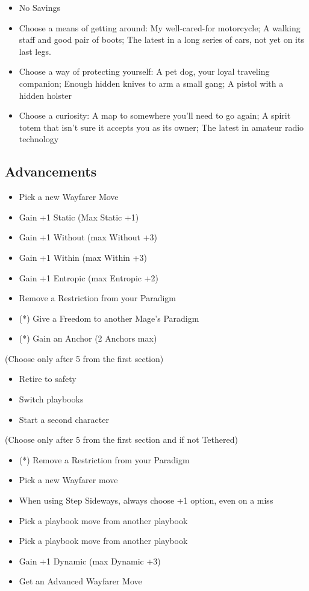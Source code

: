 \documentclass[
  oneside,
  statementpaper,
  9pt]{memoir}
\begin{document}
\begin{itemize}
\tightlist
\item
  No Savings
\item
  Choose a means of getting around: My well-cared-for motorcycle; A
  walking staff and good pair of boots; The latest in a long series of
  cars, not yet on its last legs.
\item
  Choose a way of protecting yourself: A pet dog, your loyal traveling
  companion; Enough hidden knives to arm a small gang; A pistol with a
  hidden holster
\item
  Choose a curiosity: A map to somewhere you'll need to go again; A
  spirit totem that isn't sure it accepts you as its owner; The latest
  in amateur radio technology
\end{itemize}

\hypertarget{advancements-8}{%
\subsection{Advancements}\label{advancements-8}}

\begin{itemize}
\tightlist
\item
  Pick a new Wayfarer Move
\item
  Gain +1 Static (Max Static +1)
\item
  Gain +1 Without (max Without +3)
\item
  Gain +1 Within (max Within +3)
\item
  Gain +1 Entropic (max Entropic +2)
\item
  Remove a Restriction from your Paradigm
\item
  (*) Give a Freedom to another Mage's Paradigm
\item
  (*) Gain an Anchor (2 Anchors max)
\end{itemize}

(Choose only after 5 from the first section)

\begin{itemize}
\tightlist
\item
  Retire to safety
\item
  Switch playbooks
\item
  Start a second character
\end{itemize}

(Choose only after 5 from the first section and if not Tethered)

\begin{itemize}
\tightlist
\item
  (*) Remove a Restriction from your Paradigm
\item
  Pick a new Wayfarer move
\item
  When using Step Sideways, always choose +1 option, even on a miss
\item
  Pick a playbook move from another playbook
\item
  Pick a playbook move from another playbook
\item
  Gain +1 Dynamic (max Dynamic +3)
\item
  Get an Advanced Wayfarer Move
\end{itemize}

\newpage

\setlength{\parindent}{1em}
\end{document}
